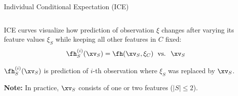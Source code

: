 \documentclass[11pt,compress,t,notes=noshow, aspectratio=169, xcolor=table]{beamer}
\begin{document}
\begin{frame}{Individual Conditional Expectation (ICE) }
\begin{columns}[T]
\begin{column}{0.84\textwidth}
ICE curves visualize how prediction of observation $\xi$ changes after varying its feature values $\xi_S$ while keeping all other features in $C$ fixed:
$$\fh_{S}^{(i)}(\xv_S) = \fh(\xv_S, \xi_C) \; \text{ vs. } \; \xv_S$$

$\fh_{S}^{(i)}(\xv_S)$ is prediction of $i$-th observation where $\xi_S$ was replaced by $\xv_S$.

\textbf{Note:} In practice, $\xv_S$ consists of one or two features ($|S| \leq 2$).

\end{column}
\end{columns}



%
\end{frame}
\end{document}
